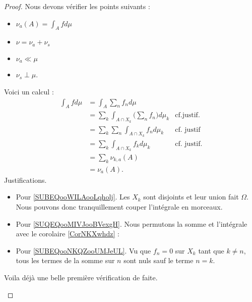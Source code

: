 \begin{proof}
	Nous devons vérifier les points suivants :
	\begin{itemize}
		\item
		      \( \nu_a(A)=\int_Afd\mu\)
		\item
		      $\nu=\nu_a+\nu_s$
		\item
		      \( \nu_a\ll \mu\)
		\item
		      \( \nu_s\perp\mu\).
	\end{itemize}
	\begin{subproof}
		\spitem[\( \int_Adf\mu=\nu(A)\)]
		Voici un calcul :
		\begin{subequations}
			\begin{align}
				\int_Afd\mu & =\int_A\sum_nf_nd\mu                                                                               \\
				            & =\sum_k\int_{A\cap X_k}\big( \sum_nf_n \big)d\mu_k & \text{cf.justif.}	\label{SUBEQooWILAooLqholj}  \\
				            & = \sum_k\sum_n\int_{A\cap X_k}f_nd\mu_k            & \text{cf. justif}\label{SUQEQooMIVJooBVexgH}  \\
				            & = \sum_k\int_{A\cap X_k}f_kd\mu_k                  & \text{cf. justif.}		\label{SUBEQooNKQZooUMJeUL} \\
				            & = \sum_k \nu_{k,a}(A)                                                                              \\
				            & =\nu_a(A).
			\end{align}
		\end{subequations}
		Justifications.
		\begin{itemize}
			\item
			      Pour \eqref{SUBEQooWILAooLqholj}. Les \( X_k\) sont disjoints et leur union fait \( \Omega\). Nous pouvons donc tranquillement couper l'intégrale en morceaux.
			\item
			      Pour \eqref{SUQEQooMIVJooBVexgH}.
			      Nous permutons la somme et l'intégrale avec le corolaire \ref{CorNKXwhdz} :
			\item
			      Pour \eqref{SUBEQooNKQZooUMJeUL}. Vu que \( f_n=0\) sur \( X_k\) tant que \( k\neq n\), tous les termes de la somme sur \( n\) sont nuls sauf le terme \( n=k\).
		\end{itemize}
		Voila déjà une belle première vérification de faite.


\end{subproof}
\end{proof}
